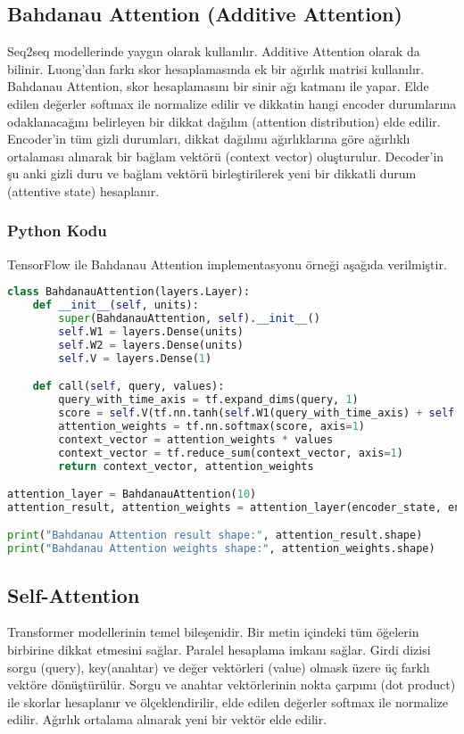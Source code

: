 \newpage

\subsection{Bahdanau Attention (Additive Attention)}
Seq2seq modellerinde yaygın olarak kullanılır. Additive Attention olarak da bilinir. Luong'dan farkı skor hesaplamasında ek bir ağırlık matrisi kullanılır. Bahdanau Attention, skor hesaplamasını bir sinir ağı katmanı ile yapar. Elde edilen değerler softmax ile normalize edilir ve dikkatin hangi encoder durumlarına odaklanacağını belirleyen bir dikkat dağılım (attention distribution) elde edilir. Encoder'in tüm gizli durumları, dikkat dağılımı ağırlıklarına göre ağırlıklı ortalaması alınarak bir bağlam vektörü (context vector) oluşturulur. Decoder'in şu anki gizli duru ve bağlam vektörü birleştirilerek yeni bir dikkatli durum (attentive state) hesaplanır.

\subsubsection{Python Kodu}

TensorFlow ile Bahdanau Attention implementasyonu örneği aşağıda verilmiştir.

\begin{lstlisting}[language=Python]
class BahdanauAttention(layers.Layer):
    def __init__(self, units):
        super(BahdanauAttention, self).__init__()
        self.W1 = layers.Dense(units)
        self.W2 = layers.Dense(units)
        self.V = layers.Dense(1)

    def call(self, query, values):
        query_with_time_axis = tf.expand_dims(query, 1)
        score = self.V(tf.nn.tanh(self.W1(query_with_time_axis) + self.W2(values)))
        attention_weights = tf.nn.softmax(score, axis=1)
        context_vector = attention_weights * values
        context_vector = tf.reduce_sum(context_vector, axis=1)
        return context_vector, attention_weights

attention_layer = BahdanauAttention(10)
attention_result, attention_weights = attention_layer(encoder_state, encoder_output)

print("Bahdanau Attention result shape:", attention_result.shape)
print("Bahdanau Attention weights shape:", attention_weights.shape)
\end{lstlisting}

\newpage

\subsection{Self-Attention}
Transformer modellerinin temel bileşenidir. Bir metin içindeki tüm öğelerin birbirine dikkat etmesini sağlar. Paralel hesaplama imkanı sağlar. Girdi dizisi sorgu (query), key(anahtar) ve değer vektörleri (value) olmask üzere üç farklı vektöre dönüştürülür. Sorgu ve anahtar vektörlerinin nokta çarpımı (dot product) ile skorlar hesaplanır ve ölçeklendirilir, elde edilen değerler softmax ile normalize edilir. Ağırlık ortalama alınarak yeni bir vektör elde edilir.

